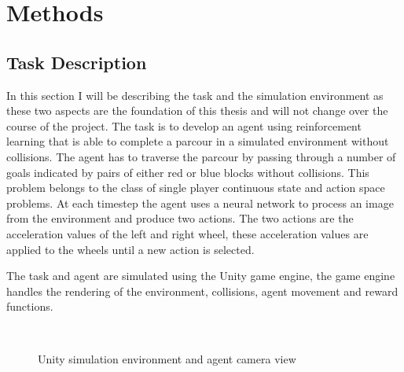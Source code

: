 \chapter{Methods}
\label{cha:Methods}



\section{Task Description}

In this section I will be describing the task and the simulation environment as these two aspects are the foundation of this thesis and will not change over the course of the project.
The task is to develop an agent using reinforcement learning that is able to complete a parcour in a simulated environment without collisions. The agent has to traverse the parcour by passing through a number of goals indicated by pairs of either red or blue blocks without collisions. This problem belongs to the class of single player continuous state and action space problems. At each timestep the agent uses a neural network to process an image from the environment and produce two actions. The two actions are the acceleration values of the left and right wheel, these acceleration values are applied to the wheels until a new action is selected.%

The task and agent are simulated using the Unity game engine, the game engine handles the rendering of the environment, collisions, agent movement and reward functions.


\begin{figure}
     \centering
     \qquad
     \\
     \caption{Unity simulation environment and agent camera view}
\end{figure}


